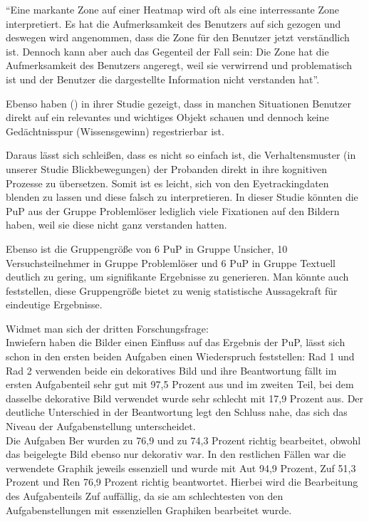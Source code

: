 ``Eine markante Zone auf einer Heatmap wird oft als eine interressante Zone interpretiert. Es hat die Aufmerksamkeit des Benutzers auf sich gezogen und deswegen wird angenommen, dass die Zone für den Benutzer jetzt verständlich ist. Dennoch kann aber auch das Gegenteil der Fall sein: Die Zone hat die Aufmerksamkeit des Benutzers angeregt, weil sie verwirrend und problematisch ist und der Benutzer die dargestellte Information nicht verstanden hat''.

Ebenso haben \citeauthor{hayhoe2005eye} () in ihrer Studie gezeigt, dass in manchen Situationen Benutzer direkt auf ein relevantes und wichtiges Objekt schauen und dennoch keine Gedächtnisspur (Wissensgewinn) regestrierbar ist. 

Daraus lässt sich schleißen, dass es nicht so einfach ist, die Verhaltensmuster (in unserer Studie Blickbewegungen) der Probanden direkt in ihre kognitiven Prozesse zu übersetzen. Somit ist es leicht, sich von den Eyetrackingdaten blenden zu lassen und diese falsch zu interpretieren. In dieser Studie könnten die \gls{PuP} aus der Gruppe Problemlöser lediglich viele Fixationen auf den Bildern haben, weil sie diese nicht ganz verstanden hatten. 

Ebenso ist die Gruppengröße von 6 \gls{PuP} in Gruppe Unsicher, 10 Versuchsteilnehmer in Gruppe Problemlöser und 6 \gls{PuP} in Gruppe Textuell deutlich zu gering, um signifikante Ergebnisse zu generieren. Man könnte auch feststellen, diese Gruppengröße bietet zu wenig statistische Aussagekraft für eindeutige Ergebnisse. 

Widmet man sich der dritten Forschungsfrage:\\
Inwiefern haben die Bilder einen Einfluss auf das Ergebnis der \gls{PuP}, lässt sich schon in den ersten beiden Aufgaben einen Wiederspruch feststellen: \gls{Rad} 1 und \gls{Rad} 2 verwenden beide ein dekoratives Bild und ihre Beantwortung fällt im ersten Aufgabenteil sehr gut mit 97,5 Prozent aus und im zweiten Teil, bei dem dasselbe dekorative Bild verwendet wurde sehr schlecht mit 17,9 Prozent aus. Der deutliche Unterschied in der Beantwortung legt den Schluss nahe, das sich das Niveau der Aufgabenstellung unterscheidet.\\
Die Aufgaben \gls{Ber} wurden zu 76,9 und zu 74,3 Prozent richtig bearbeitet, obwohl das beigelegte Bild ebenso nur dekorativ war. In den restlichen Fällen war die verwendete Graphik jeweils essenziell und wurde mit \gls{Aut} 94,9 Prozent, \gls{Zuf} 51,3 Prozent und \gls{Ren} 76,9 Prozent richtig beantwortet. Hierbei wird die Bearbeitung des Aufgabenteils \gls{Zuf} auffällig, da sie am schlechtesten von den Aufgabenstellungen mit essenziellen Graphiken bearbeitet wurde. 


